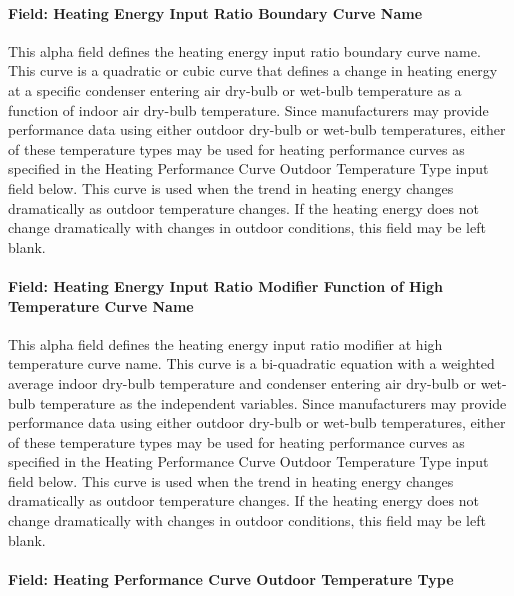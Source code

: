 \paragraph{Field: Heating Energy Input Ratio Boundary Curve Name}\label{field-heating-energy-input-ratio-boundary-curve-name}

This alpha field defines the heating energy input ratio boundary curve name. This curve is a quadratic or cubic curve that defines a change in heating energy at a specific condenser entering air dry-bulb or wet-bulb temperature as a function of indoor air dry-bulb temperature. Since manufacturers may provide performance data using either outdoor dry-bulb or wet-bulb temperatures, either of these temperature types may be used for heating performance curves as specified in the Heating Performance Curve Outdoor Temperature Type input field below. This curve is used when the trend in heating energy changes dramatically as outdoor temperature changes. If the heating energy does not change dramatically with changes in outdoor conditions, this field may be left blank.

\paragraph{Field: Heating Energy Input Ratio Modifier Function of High Temperature Curve Name}\label{field-heating-energy-input-ratio-modifier-function-of-high-temperature-curve-name}

This alpha field defines the heating energy input ratio modifier at high temperature curve name. This curve is a bi-quadratic equation with a weighted average indoor dry-bulb temperature and condenser entering air dry-bulb or wet-bulb temperature as the independent variables. Since manufacturers may provide performance data using either outdoor dry-bulb or wet-bulb temperatures, either of these temperature types may be used for heating performance curves as specified in the Heating Performance Curve Outdoor Temperature Type input field below. This curve is used when the trend in heating energy changes dramatically as outdoor temperature changes. If the heating energy does not change dramatically with changes in outdoor conditions, this field may be left blank.

\paragraph{Field: Heating Performance Curve Outdoor Temperature Type}\label{field-heating-performance-curve-outdoor-temperature-type}

